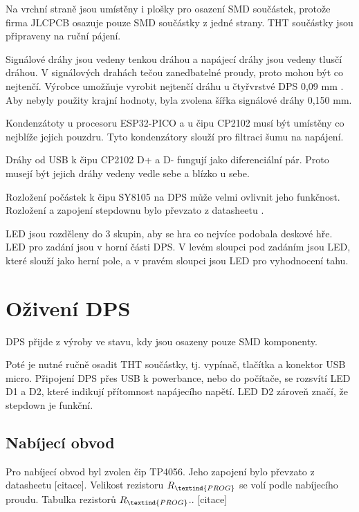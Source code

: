 Na vrchní straně jsou umístěny i plošky pro osazení SMD součástek, protože firma JLCPCB osazuje pouze SMD součástky z jedné 
strany. THT součástky jsou připraveny na ruční pájení.

Signálové dráhy jsou vedeny tenkou dráhou a napájecí dráhy jsou vedeny tlusčí dráhou. V signálových drahách tečou zanedbatelné 
proudy, proto mohou být co nejtenčí. Výrobce umožňuje vyrobit nejtenčí dráhu u čtyřvrstvé DPS 0,09 mm \cite{JLCPCB_Capabilities}. 
Aby nebyly použity krajní hodnoty, byla zvolena šířka signálové dráhy 0,150 mm.

Kondenzátoty u procesoru ESP32-PICO a u čipu CP2102 musí být umístěny co nejblíže jejich pouzdru. Tyto kondenzátory slouží pro 
filtraci šumu na napájení.

Dráhy od USB k čipu CP2102 D+ a D- fungují jako diferenciální pár. Proto musejí být jejich dráhy vedeny vedle sebe a blízko u 
sebe.

Rozložení počástek k čipu SY8105 na DPS může velmi ovlivnit jeho funkčnost. Rozložení a zapojení stepdownu 
bylo převzato z datasheetu \cite{SY8105_datasheet}. %

LED jsou rozděleny do 3 skupin, aby se hra co nejvíce podobala deskové hře. LED pro zadání jsou v horní části DPS. V levém 
sloupci pod zadáním jsou LED, které slouží jako herní pole, a v pravém sloupci jsou LED pro vyhodnocení tahu.

\chapter{Oživení DPS}
DPS přijde z výroby ve stavu, kdy jsou osazeny pouze SMD komponenty. %

Poté je nutné ručně osadit THT součástky, tj. vypínač, tlačítka a konektor USB micro. Připojení DPS přes USB k powerbance, 
nebo do počítače, se rozsvítí LED D1 a D2, které indikují přítomnost napájecího napětí. LED D2 zároveň značí, že stepdown je 
funkční.















\section{Nabíjecí obvod}
Pro nabíjecí obvod byl zvolen čip TP4056. Jeho zapojení bylo převzato z datasheetu [citace]. %
Velikost rezistoru $R_\textind{PROG}$ se volí podle nabíjecího proudu. 
Tabulka rezistorů $R_\textind{PROG}$.. [citace]

